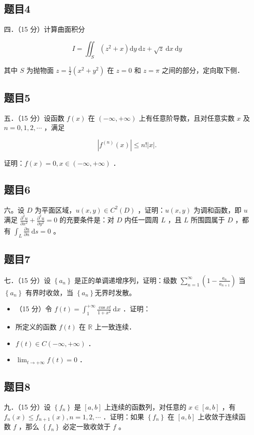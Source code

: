 \documentclass{article}
\begin{document}
\subsection{题目4}
四．（15 分）计算曲面积分

\[
I=\iint_{S}\left(z^{2}+x\right) \mathrm{d} y \mathrm{~d} z+\sqrt{z} \mathrm{~d} x \mathrm{~d} y
\]

其中 \(S\) 为抛物面 \(z=\frac{1}{2}\left(x^{2}+y^{2}\right)\) 在 \(z=0\) 和 \(z=\pi\) 之间的部分，定向取下侧．

\subsection{题目5}
五．（15 分）设函数 \(f(x)\) 在 \((-\infty,+\infty)\) 上有任意阶导数，且对任意实数 \(x\) 及 \(n=0,1,2, \cdots\) ，满足

\[
\left|f^{(n)}(x)\right| \leq n!|x| .
\]

证明：\(f(x)=0, x \in(-\infty,+\infty)\) ．

\subsection{题目6}
六。设 \(D\) 为平面区域，\(u(x, y) \in C^{2}(D)\) ，证明：\(u(x, y)\) 为调和函数，即 \(u\) 满足 \(\frac{\partial^{2} u}{\partial x^{2}}+\frac{\partial^{2} u}{\partial y^{2}}=0\) 的充要条件是：对 \(D\) 内任一圆周 \(L\) ，且 \(L\) 所围圆属于 \(D\) ，都有 \(\int_{L} \frac{\partial u}{\partial n} \mathrm{~d} s=0\) 。

\subsection{题目7}
七．（15 分）设 \(\left\{a_{n}\right\}\) 是正的单调递增序列，证明：级数 \(\sum_{n=1}^{\infty}\left(1-\frac{a_{n}}{a_{n+1}}\right)\) 当 \(\left\{a_{n}\right\}\) 有界时收敛，当 \(\left\{a_{n}\right\}\)无界时发散。

\begin{itemize}
  \item[八．] （15 分）令 \(f(t)=\int_{1}^{+\infty} \frac{\cos x t}{1+x^{2}} \mathrm{~d} x\) ．证明：
  \item[（1）] 所定义的函数 \(f(t)\) 在 \(\mathbb{R}\) 上一致连续．
  \item[（2）] \(f(t) \in C(-\infty,+\infty)\) ．
  \item[（3）] \(\lim _{t \rightarrow+\infty} f(t)=0\) ．
\end{itemize}

\subsection{题目8}
九．（15 分）设 \(\left\{f_{n}\right\}\) 是 \([a, b]\) 上连续的函数列，对任意的 \(x \in[a, b]\) ，有 \(f_{n}(x) \leq f_{n+1}(x), n=1,2, \cdots\) ．证明：如果 \(\left\{f_{n}\right\}\) 在 \([a, b]\) 上收敛于连续函数 \(f\) ，那么 \(\left\{f_{n}\right\}\) 必定一致收敛于 \(f\) 。
\end{document}
